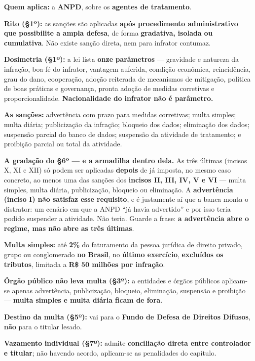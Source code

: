 \begin{conceito}
\textbf{Quem aplica:} a \textbf{ANPD}, sobre os \textbf{agentes de
tratamento}.

\textbf{Rito (§1º):} as sanções são aplicadas \textbf{após procedimento
administrativo que possibilite a ampla defesa}, de forma \textbf{gradativa,
isolada ou cumulativa}. Não existe sanção direta, nem para infrator contumaz.

\textbf{Dosimetria (§1º):} a lei lista \textbf{onze parâmetros} --- gravidade
e natureza da infração, boa-fé do infrator, vantagem auferida, condição
econômica, reincidência, grau do dano, cooperação, adoção reiterada de
mecanismos de mitigação, política de boas práticas e governança, pronta adoção
de medidas corretivas e proporcionalidade. \textbf{Nacionalidade do infrator
não é parâmetro.}

\textbf{As sanções:} advertência com prazo para medidas corretivas; multa
simples; multa diária; publicização da infração; bloqueio dos dados;
eliminação dos dados; suspensão parcial do banco de dados; suspensão da
atividade de tratamento; e proibição parcial ou total da atividade.

\textbf{A gradação do §6º --- e a armadilha dentro dela.} As três últimas
(incisos X, XI e XII) só podem ser aplicadas \textbf{depois} de já imposta, no
mesmo caso concreto, ao menos uma das sanções dos \textbf{incisos II, III, IV,
V e VI} --- multa simples, multa diária, publicização, bloqueio ou eliminação.
A \textbf{advertência (inciso I) não satisfaz esse requisito}, e é justamente
aí que a banca monta o distrator: um cenário em que a ANPD ``já havia
advertido'' e por isso teria podido suspender a atividade. Não teria. Guarde a
frase: \textbf{a advertência abre o regime, mas não abre as três últimas}.

\textbf{Multa simples:} até \textbf{2\%} do faturamento da pessoa jurídica de
direito privado, grupo ou conglomerado \textbf{no Brasil}, no \textbf{último
exercício}, \textbf{excluídos os tributos}, limitada a \textbf{R\$ 50 milhões
por infração}.

\textbf{Órgão público não leva multa (§3º):} a entidades e órgãos públicos
aplicam-se apenas advertência, publicização, bloqueio, eliminação, suspensão e
proibição --- \textbf{multa simples e multa diária ficam de fora}.

\textbf{Destino da multa (§5º):} vai para o \textbf{Fundo de Defesa de
Direitos Difusos}, \textbf{não} para o titular lesado.

\textbf{Vazamento individual (§7º):} admite \textbf{conciliação direta entre
controlador e titular}; não havendo acordo, aplicam-se as penalidades do
capítulo.
\end{conceito}

